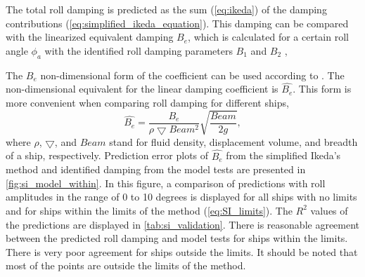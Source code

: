 \noindent The total roll damping is predicted as the sum (\autoref{eq:ikeda}) of the damping contributions (\autoref{eq:simplified_ikeda_equation}). This damping can be compared with the linearized equivalent damping $B_e$, which is calculated for a certain roll angle $\phi_a$ with the identified roll damping parameters $B_1$ and $B_2$ \cite{himeno_prediction_1981},


\noindent The $B_e$ non-dimensional form of the coefficient can be used according to \textcite{himeno_prediction_1981}. The non-dimensional equivalent for the linear damping coefficient is $\hat{B_e}$. This form is more convenient when comparing roll damping for different ships,
\begin{equation} \label{eq:be_eqvalent}
    \hat{B_e} = \frac{B_e}{\rho \bigtriangledown Beam^2} \sqrt{\frac{Beam}{2g}},
\end{equation}
\noindent where $\rho$, $\bigtriangledown$, and $Beam$ stand for fluid density, displacement volume, and breadth of a ship, respectively. Prediction error plots of $\hat{B_e}$ from the simplified Ikeda's method and identified damping from the model tests are presented in \autoref{fig:si_model_within}. In this figure, a comparison of predictions with roll amplitudes in the range of 0 to 10 degrees is displayed for all ships with no limits and for ships within the limits of the method (\autoref{eq:SI_limits}). The $R^2$ values of the predictions are displayed in \autoref{tab:si_validation}. There is reasonable agreement between the predicted roll damping and model tests for ships within the limits. There is very poor agreement for ships outside the limits. It should be noted that most of the points are outside the limits of the method.

